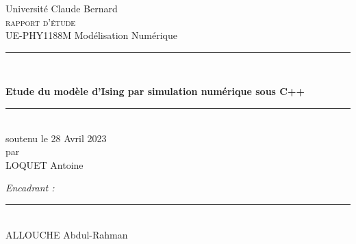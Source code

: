 \documentclass{article}
\begin{document}
\thispagestyle{empty}
\begin{center}
    {\Large{Université Claude Bernard}} \\\vfill
    \textsc{\huge{rapport d'étude}} \\
    \vfill
    {\Large{UE-PHY1188M Modélisation Numérique}}
    \vfill
    \rule{0.95\textwidth}{0.5pt}\\\vspace{0.9\baselineskip}

    {\Huge{\textbf{Etude du modèle d'Ising par simulation numérique sous C++}}} 
    \rule{0.95\textwidth}{0.5pt}\\\vfill
    {\Large{soutenu le 28 Avril 2023\\
    \vspace{1\baselineskip}
    par \\
    \vspace{1\baselineskip}
    LOQUET Antoine}} \\\vfill
\end{center}

\Large\emph{Encadrant :}\normalsize \\
\rule{0.42\textwidth}{0.1pt}\\
{\large{ALLOUCHE Abdul-Rahman}} \\


\newpage

\vspace*{\fill}
\begin{center}
\tableofcontents
\end{center}
\vspace*{\fill}
\end{document}
